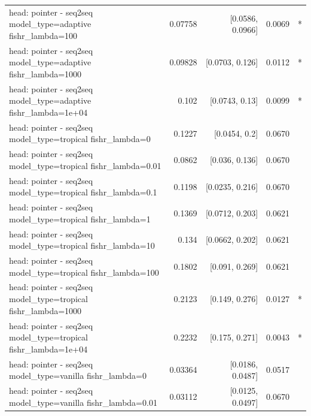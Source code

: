 \documentclass[10pt]{article}
\makeatletter
\newcommand{\stackcell}[1]{\begin{tabular}[t]{@{}l@{}}#1\end{tabular}}
\makeatother
\begin{document}
{\begin{longtable}{lrrrl}
\stackcell{head: pointer - seq2seq\\\footnotesize model\_type=adaptive fishr\_lambda=100 } & 0.07758 & [0.0586, 0.0966] & 0.0069 & *\\
\stackcell{head: pointer - seq2seq\\\footnotesize model\_type=adaptive fishr\_lambda=1000 } & 0.09828 & [0.0703, 0.126] & 0.0112 & *\\
\stackcell{head: pointer - seq2seq\\\footnotesize model\_type=adaptive fishr\_lambda=1e+04 } & 0.102 & [0.0743, 0.13] & 0.0099 & *\\
\stackcell{head: pointer - seq2seq\\\footnotesize model\_type=tropical fishr\_lambda=0 } & 0.1227 & [0.0454, 0.2] & 0.0670 & \\
\stackcell{head: pointer - seq2seq\\\footnotesize model\_type=tropical fishr\_lambda=0.01 } & 0.0862 & [0.036, 0.136] & 0.0670 & \\
\stackcell{head: pointer - seq2seq\\\footnotesize model\_type=tropical fishr\_lambda=0.1 } & 0.1198 & [0.0235, 0.216] & 0.0670 & \\
\stackcell{head: pointer - seq2seq\\\footnotesize model\_type=tropical fishr\_lambda=1 } & 0.1369 & [0.0712, 0.203] & 0.0621 & \\
\stackcell{head: pointer - seq2seq\\\footnotesize model\_type=tropical fishr\_lambda=10 } & 0.134 & [0.0662, 0.202] & 0.0621 & \\
\stackcell{head: pointer - seq2seq\\\footnotesize model\_type=tropical fishr\_lambda=100 } & 0.1802 & [0.091, 0.269] & 0.0621 & \\
\stackcell{head: pointer - seq2seq\\\footnotesize model\_type=tropical fishr\_lambda=1000 } & 0.2123 & [0.149, 0.276] & 0.0127 & *\\
\stackcell{head: pointer - seq2seq\\\footnotesize model\_type=tropical fishr\_lambda=1e+04 } & 0.2232 & [0.175, 0.271] & 0.0043 & *\\
\stackcell{head: pointer - seq2seq\\\footnotesize model\_type=vanilla fishr\_lambda=0 } & 0.03364 & [0.0186, 0.0487] & 0.0517 & \\
\stackcell{head: pointer - seq2seq\\\footnotesize model\_type=vanilla fishr\_lambda=0.01 } & 0.03112 & [0.0125, 0.0497] & 0.0670 & \\

\end{longtable}}
\end{document}
